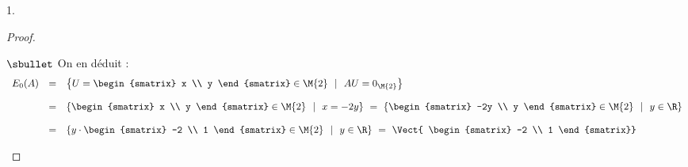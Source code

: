 \begin{noliste}{1.}
\begin{proof}
\begin{noliste}{$\sbullet$}
      \noindent
      On en déduit : %
      \[
      \begin{array}{rcl}
        E_{0}(A) & = & 
        \left\{%
          U =
          \begin{smatrix}
            x \\
            y
          \end{smatrix}
          \in \M{2}
          \ \ | \ \ 
          AU = 0_{\M{2}}
        \right\}
        \\[.4cm]
        & = & 
        \left\{%
          \begin{smatrix}
            x \\
            y
          \end{smatrix}
          \in \M{2}
          \ \ | \ \ 
          x = -2y
        \right\} 
        \ = \
        \left\{%
          \begin{smatrix}
            -2y \\
            y
          \end{smatrix}
          \in \M{2}
          \ \ | \ \ 
          y \in \R
        \right\} 
        \\[.4cm]
        & = & 
        \left\{%
          y \cdot
          \begin{smatrix}
            -2 \\
            1
          \end{smatrix}
          \in \M{2}
          \ \ | \ \ 
          y \in \R
        \right\} 
        \ = \ \Vect{
          \begin{smatrix}
            -2 \\
            1
          \end{smatrix}}
      \end{array} 
      \]
      

\end{noliste}
\end{proof}
\end{noliste}
